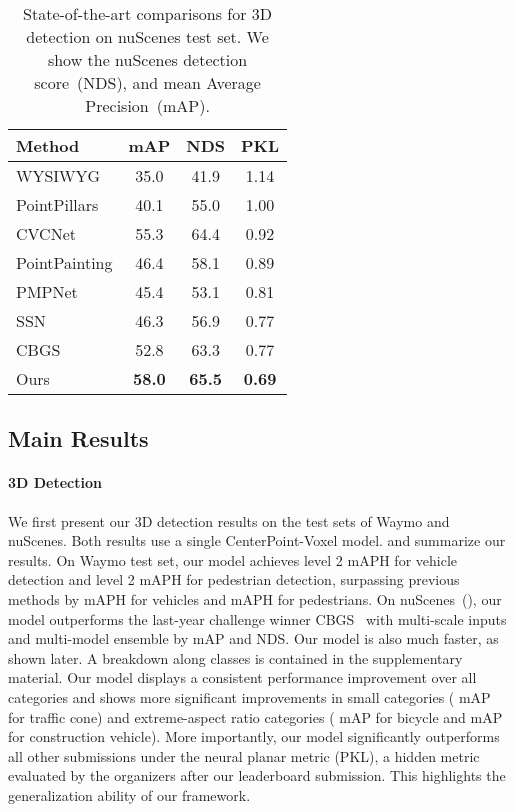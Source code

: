 \documentclass[final]{cvpr}
\begin{document}
{
\begin{table}[t]
\small
\begin{center}
\begin{tabular}{lccc}
  \toprule 
  Method  & mAP & NDS & PKL \\ 
  \midrule
  WYSIWYG \cite{hu2019exploiting}  & 35.0 & 41.9 & 1.14 \\ 
  PointPillars \cite{pillar} & 40.1 & 55.0 & 1.00 \\ 
  CVCNet \cite{chen2020view}  & 55.3 & 64.4 & 0.92 \\ 
  PointPainting \cite{vora2019pointpainting}  & 46.4 & 58.1 & 0.89 \\ 
  PMPNet \cite{yin2020Lidarbased} & 45.4 & 53.1 & 0.81 \\ 
  SSN \cite{zhu2020ssn} & 46.3 & 56.9 & 0.77 \\ 
  CBGS \cite{zhu2019classbalanced} & 52.8 &  63.3 & 0.77 \\   
 \midrule 
  Ours & \textbf{58.0} & \textbf{65.5} & \textbf{0.69} \\  
  \bottomrule
 \end{tabular}
\end{center}
\vspace{-5mm}
\small
\caption{State-of-the-art comparisons for 3D detection on nuScenes test set. We show the nuScenes detection score~(NDS), and mean Average Precision~(mAP). }
\vspace{-3mm}
\end{table}
}

\subsection{Main Results}

\paragraph{3D Detection} 
We first present our 3D detection results on the test sets of Waymo and nuScenes.
Both results use a single CenterPoint-Voxel model. 
 and  summarize our results.
On Waymo test set, our model achieves  level 2 mAPH for vehicle detection and  level 2 mAPH for pedestrian detection, surpassing previous methods by  mAPH for vehicles and  mAPH for pedestrians.
On nuScenes~(), our model outperforms the last-year challenge winner CBGS~\cite{zhu2019classbalanced} with multi-scale inputs and multi-model ensemble by  mAP and  NDS.
Our model is also much faster, as shown later.
A breakdown along classes is contained in the supplementary material.
Our model displays a consistent performance improvement over all categories and shows more significant improvements in small categories ( mAP for traffic cone) and extreme-aspect ratio categories ( mAP for bicycle and  mAP for construction vehicle).
More importantly, our model significantly outperforms all other submissions under the neural planar metric (PKL), a hidden metric evaluated by the organizers after our leaderboard submission.
This highlights the generalization ability of our framework.
\end{document}
